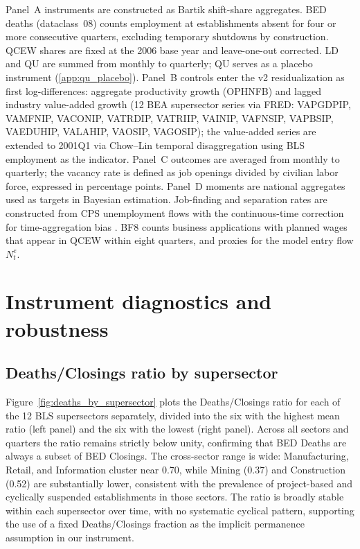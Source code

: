 \documentclass[authoryear, review, 12pt]{elsarticle}
\begin{document}
	\noindent Panel~A instruments are constructed as Bartik shift-share aggregates.
	BED deaths (dataclass~08) counts employment at establishments absent for four or more consecutive quarters, excluding temporary shutdowns by construction.
	QCEW shares are fixed at the 2006 base year and leave-one-out corrected.
	LD and QU are summed from monthly to quarterly; QU serves as a placebo instrument (\ref{app:qu_placebo}).
	Panel~B controls enter the v2 residualization as first log-differences: aggregate productivity growth (OPHNFB) and lagged industry value-added growth (12 BEA supersector series via FRED: VAPGDPIP, VAMFNIP, VACONIP, VATRDIP, VATRIIP, VAINIP, VAFNSIP, VAPBSIP, VAEDUHIP, VALAHIP, VAOSIP, VAGOSIP); the value-added series are extended to 2001Q1 via Chow--Lin temporal disaggregation using BLS employment as the indicator.
	Panel~C outcomes are averaged from monthly to quarterly; the vacancy rate is defined as job openings divided by civilian labor force, expressed in percentage points.
	Panel~D moments are national aggregates used as targets in Bayesian estimation.
	Job-finding and separation rates are constructed from CPS unemployment flows with the continuous-time correction for time-aggregation bias \citep{shimer_2005}.
	BF8 counts business applications with planned wages that appear in QCEW within eight quarters, and proxies for the model entry flow $N^e_t$.


	\section{Instrument diagnostics and robustness}\label{app:diagnostics}
	\subsection{Deaths/Closings ratio by supersector}\label{app:deaths_closings_supersector}
	Figure~\ref{fig:deaths_by_supersector} plots the Deaths/Closings ratio
	for each of the 12 BLS supersectors separately, divided into the six
	with the highest mean ratio (left panel) and the six with the lowest
	(right panel).  Across all sectors and quarters the ratio remains
	strictly below unity, confirming that BED Deaths are always a subset
	of BED Closings.  The cross-sector range is wide: Manufacturing,
	Retail, and Information cluster near 0.70, while Mining (0.37) and
	Construction (0.52) are substantially lower, consistent with the
	prevalence of project-based and cyclically suspended establishments in
	those sectors.  The ratio is broadly stable within each supersector
	over time, with no systematic cyclical pattern, supporting the use of
	a fixed Deaths/Closings fraction as the implicit permanence assumption
	in our instrument.
	
\end{document}
